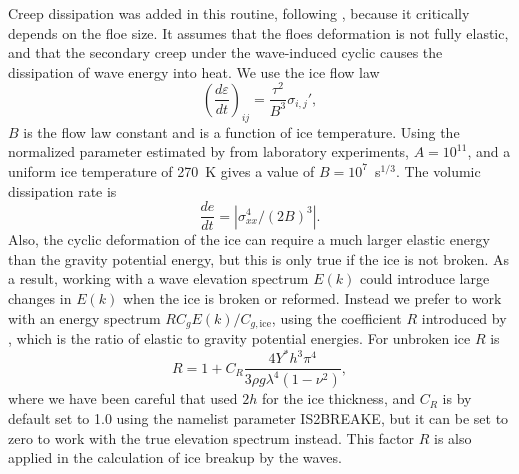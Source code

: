 Creep dissipation was added in this routine, following \cite{art:Wad73}, because it critically 
depends on the floe size.  It assumes that the floes deformation is not fully elastic, and that the secondary creep under the wave-induced cyclic causes the dissipation of wave energy into heat. 
We use the ice flow law
\begin{equation}
\left(\frac{d\varepsilon}{dt}\right)_{ij}=\frac{\tau^2}{B^3}\sigma_{i,j}',
\end{equation}
$B$ is the flow law  constant and is a function of ice temperature. Using the normalized parameter estimated by \cite{art:Cea98} from 
laboratory experiments, $A=10^{11}$,  and  a uniform ice temperature of 270~K  gives a value 
of $B=10^7$~s$^{1/3}$. The volumic dissipation rate is 
\begin{equation}
\frac{de}{dt}= | \sigma_{xx}^{4}/(2B)^3 |.
\end{equation}
Also, the cyclic deformation of the ice can require a much larger elastic energy than the gravity potential 
energy, but this is only true if the ice is not broken. As a result, working with a wave elevation spectrum $E(k)$ 
could introduce large changes in $E(k)$ when the ice is broken or reformed. Instead we prefer 
to work with an energy spectrum $ R C_g E(k)/C_{g,\mathrm{ice}}$, using the coefficient $R$ introduced by \cite{art:Wad73}, which 
is the ratio of elastic to gravity potential energies. 
For unbroken ice  $R$ is 
\begin{equation}
R=1+C_R\frac{4Y^*h^3\pi^4}{3\rho g \lambda^4(1-\nu^2)},
\label{R}
\end{equation}
where we have been careful that \cite{art:Wad73} used $2h$ for the  ice thickness, 
and $C_R$ is by default set to 1.0 using the namelist parameter {\code IS2BREAKE}, but it can 
be set to zero to work with the true elevation spectrum instead. This factor $R$ is also 
applied in the calculation of ice breakup by the waves.\\


